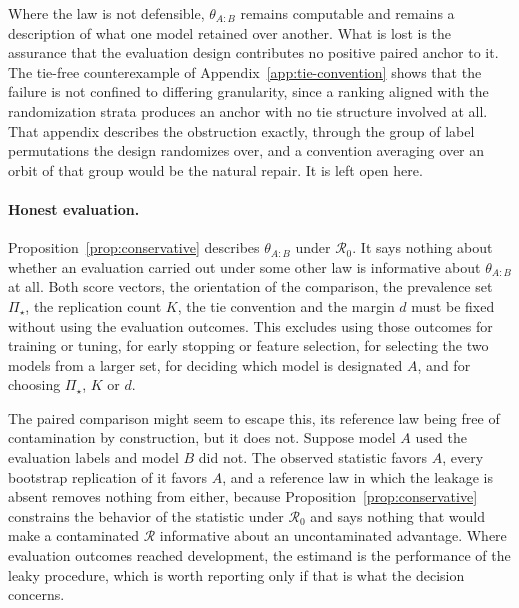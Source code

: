 \documentclass[11pt]{article}
\newcommand{\Regime}{\mathcal{R}}
\newcommand{\PSet}{\Pi_\star}
\theoremstyle{remark}
\begin{document}
Where the law is not defensible, $\theta_{A:B}$ remains computable and remains a description of what one model retained over another. What is lost is the assurance that the evaluation design contributes no positive paired anchor to it. The tie-free counterexample of Appendix~\ref{app:tie-convention} shows that the failure is not confined to differing granularity, since a ranking aligned with the randomization strata produces an anchor with no tie structure involved at all. That appendix describes the obstruction exactly, through the group of label permutations the design randomizes over, and a convention averaging over an orbit of that group would be the natural repair. It is left open here.

\paragraph{Honest evaluation.}
Proposition~\ref{prop:conservative} describes $\theta_{A:B}$ under $\Regime_0$. It says nothing about whether an evaluation carried out under some other law is informative about $\theta_{A:B}$ at all. Both score vectors, the orientation of the comparison, the prevalence set $\PSet$, the replication count $K$, the tie convention and the margin $d$ must be fixed without using the evaluation outcomes. This excludes using those outcomes for training or tuning, for early stopping or feature selection, for selecting the two models from a larger set, for deciding which model is designated $A$, and for choosing $\PSet$, $K$ or $d$.

The paired comparison might seem to escape this, its reference law being free of contamination by construction, but it does not. Suppose model $A$ used the evaluation labels and model $B$ did not. The observed statistic favors $A$, every bootstrap replication of it favors $A$, and a reference law in which the leakage is absent removes nothing from either, because Proposition~\ref{prop:conservative} constrains the behavior of the statistic under $\Regime_0$ and says nothing that would make a contaminated $\Regime$ informative about an uncontaminated advantage. Where evaluation outcomes reached development, the estimand is the performance of the leaky procedure, which is worth reporting only if that is what the decision concerns.
\end{document}
